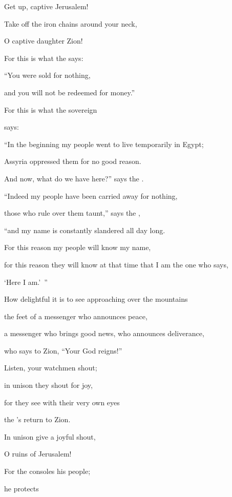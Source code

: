 {\par }{\Q Get
up, captive
Jerusalem!
\par }{\Q Take off the iron
chains
around your neck,
\par }{\Q O captive
daughter
Zion!
\par }{\Q {}For
this is what
the {}
says:
\par }{\Q “You were sold
for nothing,
\par }{\Q and you will not
be redeemed
for money.”
\par }{\Q {}For
this is what
the sovereign

{}
says:
\par }{\Q “In the beginning
my people
went
to live temporarily
in Egypt;
\par }{\Q Assyria
oppressed them for no good reason.
\par }{\Q {}And now,
what
do we have here?” says
the {}.
\par }{\Q “Indeed my people
have been carried away
for nothing,
\par }{\Q those who rule
over them taunt,”
says
the {},
\par }{\Q “and my name
is constantly
slandered
all
day long.
\par }{\Q {}For this reason
my people
will know
my name,
\par }{\Q for this reason
they will know at that time
that
I am
the one
who says,
\par }{\Q ‘Here I am.’ ”
\par }{\Q {}How
delightful
it is to see approaching over
the mountains
\par }{\Q the feet
of a messenger
who announces
peace,
\par }{\Q a messenger
who brings good
news, who announces
deliverance,
\par }{\Q who says
to Zion,
“Your God
reigns!”
\par }{\Q {}Listen,
your watchmen
shout;
\par }{\Q in unison
they shout
for joy,
\par }{\Q for
they see
with their very
own eyes
\par }{\Q the
{}’s
return
to Zion.
\par }{\Q {}In unison
give a joyful
shout,
\par }{\Q O ruins
of Jerusalem!
\par }{\Q For
the {}
consoles
his people;
\par }{\Q he protects
}
